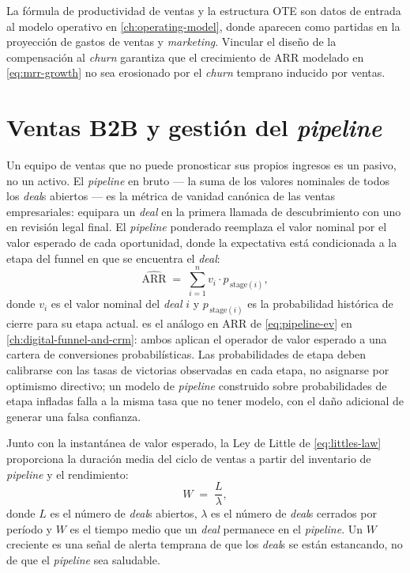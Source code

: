 La fórmula de productividad de ventas y la estructura OTE son datos de entrada al modelo operativo
en \cref{ch:operating-model}, donde aparecen como partidas en la proyección de gastos de ventas y
\emph{marketing}. Vincular el diseño de la compensación al \emph{churn} garantiza que el
crecimiento de ARR modelado en \cref{eq:mrr-growth} no sea erosionado por el \emph{churn}
temprano inducido por ventas.


\section{Ventas B2B y gestión del \emph{pipeline}}\label{sec:b2b-selling}

Un equipo de ventas que no puede pronosticar sus propios ingresos es un pasivo, no un activo. El
\emph{pipeline} en bruto --- la suma de los valores nominales de todos los \emph{deal}s abiertos
--- es la métrica de vanidad canónica de las ventas empresariales: equipara un \emph{deal} en la
primera llamada de descubrimiento con uno en revisión legal final. El \emph{pipeline} ponderado
reemplaza el valor nominal por el valor esperado de cada oportunidad, donde la expectativa está
condicionada a la etapa del funnel en que se encuentra el \emph{deal}:
\begin{equation}\label{eq:pipeline-forecast}
  \widehat{\text{ARR}} \;=\; \sum_{i=1}^{n} v_i \cdot p_{\,\text{stage}(i)},
\end{equation}
donde \(v_i\) es el valor nominal del \emph{deal} \(i\) y \(p_{\,\text{stage}(i)}\) es la
probabilidad histórica de cierre para su etapa actual.  es el análogo
en ARR de \cref{eq:pipeline-ev} en \cref{ch:digital-funnel-and-crm}: ambos aplican el operador
de valor esperado a una cartera de conversiones probabilísticas. Las probabilidades de etapa deben
calibrarse con las tasas de victorias observadas en cada etapa, no asignarse por optimismo
directivo; un modelo de \emph{pipeline} construido sobre probabilidades de etapa infladas falla a
la misma tasa que no tener modelo, con el daño adicional de generar una falsa confianza.

Junto con la instantánea de valor esperado, la Ley de Little de \cref{eq:littles-law} proporciona
la duración media del ciclo de ventas a partir del inventario de \emph{pipeline} y el rendimiento:
\[
  W \;=\; \frac{L}{\lambda},
\]
donde \(L\) es el número de \emph{deal}s abiertos, \(\lambda\) es el número de \emph{deal}s
cerrados por período y \(W\) es el tiempo medio que un \emph{deal} permanece en el
\emph{pipeline}. Un \(W\) creciente es una señal de alerta temprana de que los \emph{deal}s se
están estancando, no de que el \emph{pipeline} sea saludable.

